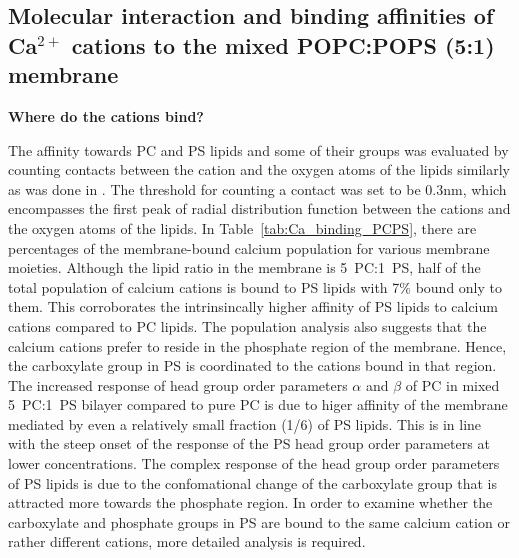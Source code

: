 \subsection{Molecular interaction and binding affinities of Ca$^{2+}$  cations to the mixed POPC:POPS (5:1) membrane} 


\textbf{Where do the cations bind?} 



The affinity towards PC and PS lipids and some of their groups was evaluated 
by counting contacts between the cation and the oxygen atoms of the lipids
similarly as was done in \cite{melcr18}. 
The threshold for counting a contact was set to be $0.3 \mathrm{nm}$, 
which encompasses the first peak of radial distribution function between the cations and the oxygen atoms of the lipids. 
In Table~\ref{tab:Ca_binding_PCPS}, there are percentages of the membrane-bound calcium population for various membrane moieties. 
Although the lipid ratio in the membrane is 5~PC:1~PS,
half of the total population of calcium cations is bound to PS lipids
with 7\% bound only to them. 
This corroborates the intrinsincally higher affinity of PS lipids to calcium cations compared to PC lipids. 
The population analysis also suggests 
that the calcium cations prefer to reside in the phosphate region of the membrane. 
Hence, the carboxylate group in PS is coordinated to the cations bound in that region. 
The increased response of head group order parameters $\alpha$ and $\beta$ of PC 
in mixed 5~PC:1~PS bilayer compared to pure PC
is due to higer affinity of the membrane mediated by even a relatively small fraction (1/6) of PS lipids. 
This is in line with the steep onset of the response of the PS head group order parameters at lower concentrations.
The complex response of the head group order parameters of PS lipids 
is due to the confomational change of the carboxylate group that is attracted more towards the phosphate region. 
In order to examine whether the carboxylate and phosphate groups in PS are bound 
to the same calcium cation or rather different cations, 
more detailed analysis is required. 


